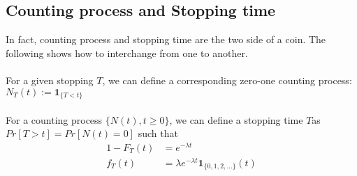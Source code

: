 \documentclass[11pt]{article}
\begin{document}
\subsection{Counting process and Stopping time}
In fact, counting process and stopping time are the two side of a coin. The following shows how to interchange from one to another.\\

\\
For a given stopping $T$, we can define a corresponding zero-one counting process: $N_T(t) := \mathbf{1}_{\{T<t \}}$\\

\\
For a counting process $\{N(t),t\geq0\}$, we can define a stopping time $T$as $Pr[T>t] = Pr[N(t)=0]$ such that
\begin{align*}
1-F_{T}(t) &= e^{-\lambda t}\\
f_T(t)&=\lambda e^{-\lambda t}\mathbf{1}_{\{0,1,2,...\}}(t)
\end{align*}
\end{document}
